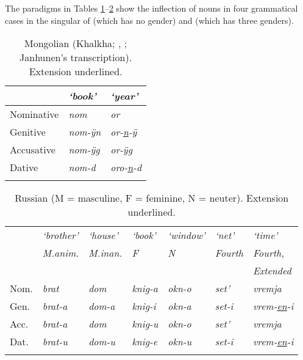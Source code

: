 \documentclass[output=collectionpaper]{langsci/langscibook}
\begin{document}
The paradigms in Tables \ref{extab:Nich:1}--\ref{extab:Nich:2} show the inflection of nouns in four grammatical cases in the singular of  (which has no gender) and  (which has three genders).

\begin{table}
\caption{Mongolian (Khalkha; \citealt[163]{Svantesson2003}, \citealt[297--298, 106--112, 66--68]{Janhunen2012}; Janhunen's transcription). Extension underlined.}
\label{extab:Nich:1}

\begin{tabular}{l>{\itshape}l>{\itshape}l}
\lsptoprule
			 & \normalfont `book'	 & \normalfont `year'			\\
			 \midrule
	Nominative &	nom	 &	or	\\
	Genitive	 &	nom-ÿn &	or-\underline{n}-ÿ	\\
	Accusative &		nom-ÿg &	or-ÿg		\\
	Dative	 &	nom-d	 &	oro-\underline{n}-d
\\\lspbottomrule\end{tabular}
\end{table}

\begin{table}
\caption{Russian (M = masculine, F = feminine, N = neuter). Extension underlined.}
\label{extab:Nich:2}

\begin{tabular}{l*{6}{>{\itshape}l}}\lsptoprule

	 &	\normalfont `brother'	 &\normalfont `house' &\normalfont 	`book' &	\normalfont `window'	 &\normalfont `net'	 &\normalfont `time'\\
	 &\normalfont 	M.anim. &\normalfont 	M.inan.	 &\normalfont F	 &\normalfont N	 &\normalfont Fourth &\normalfont 	Fourth, \\
	 &&&&&&\normalfont Extended\\
			 \midrule
	Nom.	 &brat &	dom	 &knig-a	 &okn-o &	set'	 &vremja	\\
	Gen.	 &brat-a	 &dom-a &	knig-i &	okn-a	 &set-i	 &vrem-\underline{en}-i\\
	Acc.	 &brat-a	 &dom &	knig-u	 &okn-o	 &set'	 &vremja\\
	Dat.	 &brat-u &	dom-u	 &knig-e &	okn-u &	set-i	 &vrem-\underline{en}-i
\\\lspbottomrule\end{tabular}
\end{table}
\end{document}
